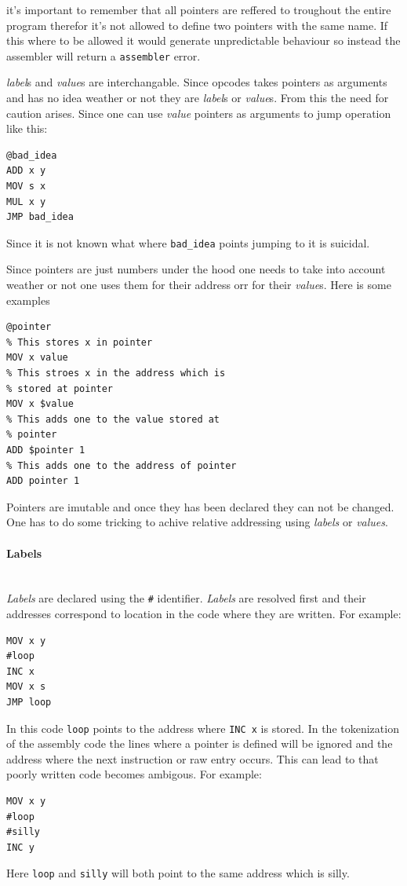 \documentclass{article}
\newcommand{\V}{\verb}
\begin{document}
it's important to remember that all pointers are reffered to troughout the entire
program therefor it's not allowed to define two pointers with the same name. If
this where to be allowed it would generate unpredictable behaviour so instead
the assembler will return a \V+assembler+ error.

\emph{label}s and \emph{value}s are interchangable. Since opcodes takes pointers as arguments
and has no idea weather or not they are \emph{label}s or \emph{value}s. From this the need for
caution arises. Since one can use \emph{value} pointers as arguments to jump operation
like this:
\begin{verbatim}
@bad_idea
ADD x y
MOV s x
MUL x y
JMP bad_idea
\end{verbatim}
Since it is not known what where \V+bad_idea+ points jumping to it is suicidal.

Since pointers are just numbers under the hood one needs to take into account
weather or not one uses them for their address orr for their \emph{value}s. Here is some
examples
\begin{verbatim}
@pointer
% This stores x in pointer
MOV x value
% This stroes x in the address which is
% stored at pointer
MOV x $value
% This adds one to the value stored at
% pointer
ADD $pointer 1
% This adds one to the address of pointer
ADD pointer 1
\end{verbatim}

Pointers are imutable and once they has been declared they can not be changed.
One has to do some tricking to achive relative addressing using \emph{labels} or
\emph{values}.


\paragraph{Labels} \
\\
\emph{Labels} are declared using the \V+#+ identifier.
\emph{Labels} are resolved first and their addresses
correspond to location in the code where they are written. For example:
\begin{verbatim}
MOV x y
#loop
INC x
MOV x s
JMP loop
\end{verbatim}
In this code \V+loop+ points to the address where \V+INC x+ is stored. In the
tokenization of the assembly code the lines where a pointer is defined will be
ignored and the address where the next instruction or raw entry occurs. This can
lead to that poorly written code becomes ambigous. For example:
\begin{verbatim}
MOV x y
#loop
#silly
INC y
\end{verbatim}
Here \V+loop+ and \V+silly+ will both point to the same address which is silly.
\end{document}

